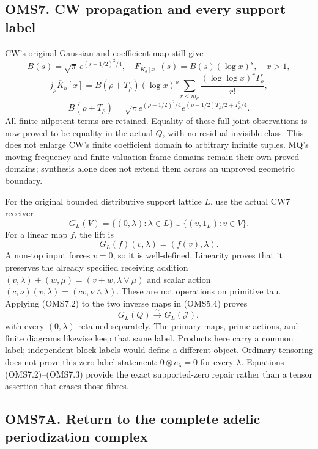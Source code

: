 \subsection{OMS7. CW propagation and every support
label}\label{oms7.-cw-propagation-and-every-support-label}

CW's original Gaussian and coefficient map still give \[
B(s)=\sqrt\pi\,e^{(s-1/2)^2/4},\quad
F_{K_b[x]}(s)=B(s)(\log x)^s,\quad x>1,
\] \[
j_\rho\overline K_b[x]=B(\rho+T_\rho)(\log x)^\rho
\sum_{r<m_\rho}\frac{(\log\log x)^rT_\rho^r}{r!},
\] \[
B(\rho+T_\rho)=\sqrt\pi e^{(\rho-1/2)^2/4}
e^{(\rho-1/2)T_\rho/2+T_\rho^2/4}.
\tag{OMS7.1}
\] All finite nilpotent terms are retained. Equality of these full joint
observations is now proved to be equality in the actual \(Q\), with no
residual invisible class. This does not enlarge CW's finite coefficient
domain to arbitrary infinite tuples. MQ's moving-frequency and
finite-valuation-frame domains remain their own proved domains;
synthesis alone does not extend them across an unproved geometric
boundary.

For the original bounded distributive support lattice \(L\), use the
actual CW7 receiver \[
G_L(V)=\{(0,\lambda):\lambda\in L\}\cup\{(v,1_L):v\in V\}.
\] For a linear map \(f\), the lift is \[
G_L(f)(v,\lambda)=(f(v),\lambda).
\tag{OMS7.2}
\] A non-top input forces \(v=0\), so it is well-defined. Linearity
proves that it preserves the already specified receiving addition
\((v,\lambda)+(w,\mu)=(v+w,\lambda\vee\mu)\) and scalar action
\((c,\nu)(v,\lambda)=(cv,\nu\wedge\lambda)\). These are not operations
on primitive tau. Applying (OMS7.2) to the two inverse maps in (OMS5.4)
proves \[
G_L(Q)\xrightarrow{\sim}G_L(\mathscr J),
\tag{OMS7.3}
\] with every \((0,\lambda)\) retained separately. The primary maps,
prime actions, and finite diagrams likewise keep that same label.
Products here carry a common label; independent block labels would
define a different object. Ordinary tensoring does not prove this
zero-label statement: \(0\otimes e_\lambda=0\) for every \(\lambda\).
Equations (OMS7.2)--(OMS7.3) provide the exact supported-zero repair
rather than a tensor assertion that erases those fibres.

\subsection{OMS7A. Return to the complete adelic periodization
complex}\label{oms7a.-return-to-the-complete-adelic-periodization-complex}

